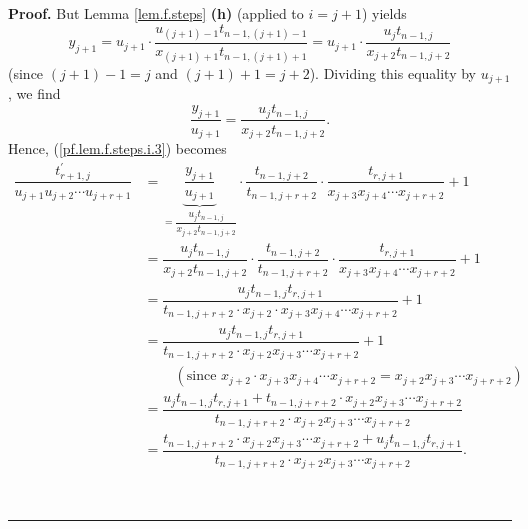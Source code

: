 \documentclass[numbers=enddot,12pt,final,onecolumn,notitlepage]{scrartcl}%
\theoremstyle{definition}
\newenvironment{proof}[1][Proof]{\noindent\textbf{#1.} }{\ \rule{0.5em}{0.5em}}
\newenvironment{verlong}{}{}
\begin{document}
\begin{proof}
\begin{verlong}
But Lemma \ref{lem.f.steps} \textbf{(h)} (applied to $i=j+1$) yields%
\[
y_{j+1}=u_{j+1}\cdot\dfrac{u_{\left(  j+1\right)  -1}t_{n-1,\left(
j+1\right)  -1}}{x_{\left(  j+1\right)  +1}t_{n-1,\left(  j+1\right)  +1}%
}=u_{j+1}\cdot\dfrac{u_{j}t_{n-1,j}}{x_{j+2}t_{n-1,j+2}}%
\]
(since $\left(  j+1\right)  -1=j$ and $\left(  j+1\right)  +1=j+2$). Dividing
this equality by $u_{j+1}$, we find%
\[
\dfrac{y_{j+1}}{u_{j+1}}=\dfrac{u_{j}t_{n-1,j}}{x_{j+2}t_{n-1,j+2}}.
\]
Hence, (\ref{pf.lem.f.steps.i.3}) becomes%
\begin{align}
\dfrac{t_{r+1,j}^{\prime}}{u_{j+1}u_{j+2}\cdots u_{j+r+1}}  &
=\underbrace{\dfrac{y_{j+1}}{u_{j+1}}}_{=\dfrac{u_{j}t_{n-1,j}}{x_{j+2}%
t_{n-1,j+2}}}\cdot\dfrac{t_{n-1,j+2}}{t_{n-1,j+r+2}}\cdot\dfrac{t_{r,j+1}%
}{x_{j+3}x_{j+4}\cdots x_{j+r+2}}+1\nonumber\\
&  =\dfrac{u_{j}t_{n-1,j}}{x_{j+2}t_{n-1,j+2}}\cdot\dfrac{t_{n-1,j+2}%
}{t_{n-1,j+r+2}}\cdot\dfrac{t_{r,j+1}}{x_{j+3}x_{j+4}\cdots x_{j+r+2}%
}+1\nonumber\\
&  =\dfrac{u_{j}t_{n-1,j}t_{r,j+1}}{t_{n-1,j+r+2}\cdot x_{j+2}\cdot
x_{j+3}x_{j+4}\cdots x_{j+r+2}}+1\nonumber\\
&  =\dfrac{u_{j}t_{n-1,j}t_{r,j+1}}{t_{n-1,j+r+2}\cdot x_{j+2}x_{j+3}\cdots
x_{j+r+2}}+1\nonumber\\
&  \ \ \ \ \ \ \ \ \ \ \left(  \text{since }x_{j+2}\cdot x_{j+3}x_{j+4}\cdots
x_{j+r+2}=x_{j+2}x_{j+3}\cdots x_{j+r+2}\right) \nonumber\\
&  =\dfrac{u_{j}t_{n-1,j}t_{r,j+1}+t_{n-1,j+r+2}\cdot x_{j+2}x_{j+3}\cdots
x_{j+r+2}}{t_{n-1,j+r+2}\cdot x_{j+2}x_{j+3}\cdots x_{j+r+2}}\nonumber\\
&  =\dfrac{t_{n-1,j+r+2}\cdot x_{j+2}x_{j+3}\cdots x_{j+r+2}+u_{j}%
t_{n-1,j}t_{r,j+1}}{t_{n-1,j+r+2}\cdot x_{j+2}x_{j+3}\cdots x_{j+r+2}}.
\label{pf.lem.f.steps.i.6}%
\end{align}



\end{verlong}
\end{proof}
\end{document}
